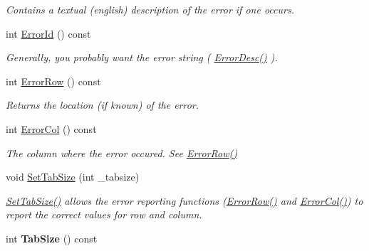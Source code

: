 \begin{DoxyCompactItemize}
\begin{DoxyCompactList}\small\item\em Contains a textual (english) description of the error if one occurs. \end{DoxyCompactList}\item 
int \hyperlink{class_ti_xml_document_af96fc2f3f9ec6422782bfe916c9e778f}{Error\+Id} () const 
\begin{DoxyCompactList}\small\item\em Generally, you probably want the error string ( \hyperlink{class_ti_xml_document_a9d0f689f6e09ea494ea547be8d79c25e}{Error\+Desc()} ). \end{DoxyCompactList}\item 
int \hyperlink{class_ti_xml_document_af30efc75e804aa2e92fb8be3a8cb676e}{Error\+Row} () const 
\begin{DoxyCompactList}\small\item\em Returns the location (if known) of the error. \end{DoxyCompactList}\item 
int \hyperlink{class_ti_xml_document_aa90bc630ee5203c6109ca5fad3323649}{Error\+Col} () const \hypertarget{class_ti_xml_document_aa90bc630ee5203c6109ca5fad3323649}{}\label{class_ti_xml_document_aa90bc630ee5203c6109ca5fad3323649}

\begin{DoxyCompactList}\small\item\em The column where the error occured. See \hyperlink{class_ti_xml_document_af30efc75e804aa2e92fb8be3a8cb676e}{Error\+Row()} \end{DoxyCompactList}\item 
void \hyperlink{class_ti_xml_document_a51dac56316f89b35bdb7d0d433ba988e}{Set\+Tab\+Size} (int \+\_\+tabsize)
\begin{DoxyCompactList}\small\item\em \hyperlink{class_ti_xml_document_a51dac56316f89b35bdb7d0d433ba988e}{Set\+Tab\+Size()} allows the error reporting functions (\hyperlink{class_ti_xml_document_af30efc75e804aa2e92fb8be3a8cb676e}{Error\+Row()} and \hyperlink{class_ti_xml_document_aa90bc630ee5203c6109ca5fad3323649}{Error\+Col()}) to report the correct values for row and column. \end{DoxyCompactList}\item 
int {\bfseries Tab\+Size} () const \hypertarget{class_ti_xml_document_a612360241b85bad0826b2a9ae9cda561}{}\label{class_ti_xml_document_a612360241b85bad0826b2a9ae9cda561}


\end{DoxyCompactItemize}
